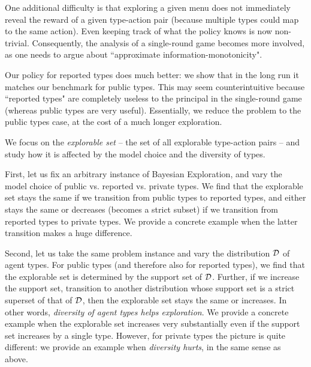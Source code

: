 One additional difficulty is that exploring a given menu does not immediately reveal the reward of a given type-action pair (because multiple types could map to the same action). Even keeping track of what the policy knows is now non-trivial. Consequently, the analysis of a single-round game becomes more involved, as one needs to argue about ``approximate information-monotonicity".

Our policy for reported types does much better: we show that in the long run it matches our benchmark for public types. This may seem counterintuitive because ``reported types" are completely useless to the principal in the single-round game (whereas public types are very useful). Essentially, we reduce the problem to the public types case, at the cost of a much longer exploration.

We focus on the \emph{explorable set} -- the set of all explorable type-action pairs -- and study how  it is affected by the model choice and the diversity of types.

First, let us fix an arbitrary instance of Bayesian Exploration, and vary the model choice of public vs. reported vs. private types. We find that the explorable set stays the same if we transition from public types to reported types, and either stays the same or decreases (becomes a strict subset) if we transition from reported types to private types. We provide a concrete example when the latter transition makes a huge difference.

Second, let us take the same problem instance and vary the distribution $\mathcal{D}$ of agent types. For public types (and therefore also for reported types), we find that the explorable set is determined by the support set of $\mathcal{D}$. Further, if we increase the support set, \ie transition to another distribution whose support set is a strict superset of that of $\mathcal{D}$, then the explorable set stays the same or increases. In other words, \emph{diversity of agent types helps exploration}. We provide a concrete example when the explorable set increases very substantially even if the support set increases by a single type. However, for private types the picture is quite different: we provide an example when \emph{diversity hurts}, in the same sense as above. 
